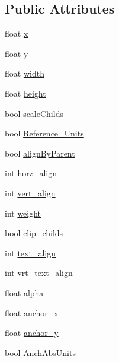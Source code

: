 \subsection*{Public Attributes}
\begin{DoxyCompactItemize}
\item 
float \hyperlink{class_g_u_i_i_s_o_drawer_a983dcc2c72b355fcffac7d0d0cbec213}{x}
\item 
float \hyperlink{class_g_u_i_i_s_o_drawer_ae63d81ef3e015cc3f3497363104c909f}{y}
\item 
float \hyperlink{class_g_u_i_i_s_o_drawer_ab559dd7333ceaa8ead89c9eefb38f471}{width}
\item 
float \hyperlink{class_g_u_i_i_s_o_drawer_a8d95573525d0b42416ae74ec89c77da7}{height}
\item 
bool \hyperlink{class_g_u_i_i_s_o_drawer_ab3bda86519b92fc7aab82757bf4c74a7}{scale\+Childs}
\item 
bool \hyperlink{class_g_u_i_i_s_o_drawer_a202be16bc522871743e930cb5c037270}{Reference\+\_\+\+Units}
\item 
bool \hyperlink{class_g_u_i_i_s_o_drawer_ac3eeda3d542a4ab02850c6f467b5900d}{align\+By\+Parent}
\item 
int \hyperlink{class_g_u_i_i_s_o_drawer_aa1dc69c099ff78233d6d3275ed5bd4fb}{horz\+\_\+align}
\item 
int \hyperlink{class_g_u_i_i_s_o_drawer_ae45d32f4a48e496fb91770d697b9900b}{vert\+\_\+align}
\item 
int \hyperlink{class_g_u_i_i_s_o_drawer_a5a67d8f9b025602a3292910b32ee1a4a}{weight}
\item 
bool \hyperlink{class_g_u_i_i_s_o_drawer_ac1ad7f135b6723521a36865f6741e6f4}{clip\+\_\+childs}
\item 
int \hyperlink{class_g_u_i_i_s_o_drawer_aebbbb131e0eb3e8c38ff5c5eda30ba09}{text\+\_\+align}
\item 
int \hyperlink{class_g_u_i_i_s_o_drawer_ad7e43a495216df46ebc4f6373343e6d0}{vrt\+\_\+text\+\_\+align}
\item 
float \hyperlink{class_g_u_i_i_s_o_drawer_a1690c93c8843c087e8d2896569bbcafe}{alpha}
\item 
float \hyperlink{class_g_u_i_i_s_o_drawer_a6ad39eb8f188969e6669532b6b59f76b}{anchor\+\_\+x}
\item 
float \hyperlink{class_g_u_i_i_s_o_drawer_ae75a6e6e1bd5df29d7a0634722a20882}{anchor\+\_\+y}
\item 
bool \hyperlink{class_g_u_i_i_s_o_drawer_aec65c9b0f86901bd4722541237c8ee7b}{Anch\+Abs\+Units}
\item 

\end{DoxyCompactItemize}
